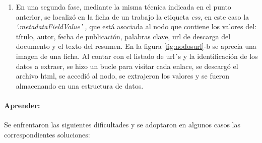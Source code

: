 \documentclass[
  12pt,
  openany]{book}
\providecommand{\tightlist}{%
  \setlength{\itemsep}{0pt}\setlength{\parskip}{0pt}}
\begin{document}
\begin{enumerate}
\def\labelenumi{\arabic{enumi}.}
\setcounter{enumi}{1}
\tightlist
\item
  En una segunda fase, mediante la misma técnica indicada en el punto anterior, se localizó en la ficha de un trabajo la etiqueta \emph{css}, en este caso la \emph{`.metadataFieldValue' ,} que está asociada al nodo que contiene los valores del: título, autor, fecha de publicación, palabras clave, url de descarga del documento y el texto del resumen. En la figura \ref{fig:nodosurl}-b se aprecia una imagen de una ficha. Al contar con el listado de url´s y la identificación de los datos a extraer, se hizo un bucle para visitar cada enlace, se descargó el archivo html, se accedió al nodo, se extrajeron los valores y se fueron almacenando en una estructura de datos.
\end{enumerate}

\hypertarget{aprender}{%
\paragraph{Aprender:}\label{aprender}}

Se enfrentaron las siguientes dificultades y se adoptaron en algunos casos las correspondientes soluciones:
\end{document}
